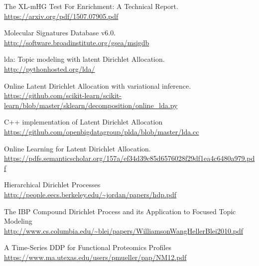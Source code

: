 \documentclass[11pt]{article}
\begin{document}
\begin{thebibliography}{9}
        The XL-mHG Test For Enrichment: A Technical Report.
        \url{https://arxiv.org/pdf/1507.07905.pdf}
         
        Molecular Signatures Database v6.0.
        \url{http://software.broadinstitute.org/gsea/msigdb}
         
        lda: Topic modeling with latent Dirichlet Allocation.
        \url{http://pythonhosted.org/lda/}

        Online Latent Dirichlet Allocation with variational inference.
        \url{https://github.com/scikit-learn/scikit-learn/blob/master/sklearn/decomposition/online_lda.py}

        C++ implementation of Latent Dirichlet Allocation
        \url{https://github.com/openbigdatagroup/plda/blob/master/lda.cc}

        Online Learning for Latent Dirichlet Allocation.
        \url{https://pdfs.semanticscholar.org/157a/ef34d39c85d6576028f29df1ea4c6480a979.pdf}

        Hierarchical Dirichlet Processes
        \url{http://people.eecs.berkeley.edu/~jordan/papers/hdp.pdf}

        The IBP Compound Dirichlet Process and its Application to Focused Topic Modeling
        \url{http://www.cs.columbia.edu/~blei/papers/WilliamsonWangHellerBlei2010.pdf}

        A Time-Series DDP for Functional Proteomics Profiles
        \url{https://www.ma.utexas.edu/users/pmueller/pap/NM12.pdf}


\end{thebibliography}
\end{document}
